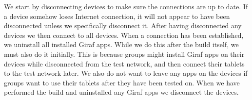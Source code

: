We start by disconnecting devices to make sure the connections are up to date. If a device somehow loses Internet connection, it will not appear to have been disconnected unless we specifically disconnect it. After having disconnected any devices we then connect to all devices. When a connection has been established, we uninstall all installed Giraf apps. While we do this after the build itself, we must also do it initially. This is because groups might install Giraf apps on their devices while disconnected from the test network, and then connect their tablets to the test network later. We also do not want to leave any apps on the devices if groups want to use their tablets after they have been tested on. When we have performed the build and uninstalled any Giraf apps we disconnect the devices.
